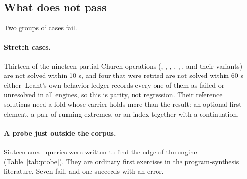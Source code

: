 \subsection{What does not pass}

Two groups of cases fail.

\paragraph{Stretch cases.} Thirteen of the nineteen partial Church operations (, , , , , ,  and their variants) are not solved within 10 s, and four that were retried are not solved within 60 s either. Leant's own behavior ledger records every one of them as failed or unresolved in all engines, so this is parity, not regression. Their reference solutions need a fold whose carrier holds more than the result: an optional first element, a pair of running extremes, or an index together with a continuation.

\paragraph{A probe just outside the corpus.} Sixteen small queries were written to find the edge of the engine (Table~\ref{tab:probe}). They are ordinary first exercises in the program-synthesis literature. Seven fail, and one succeeds with an error.

